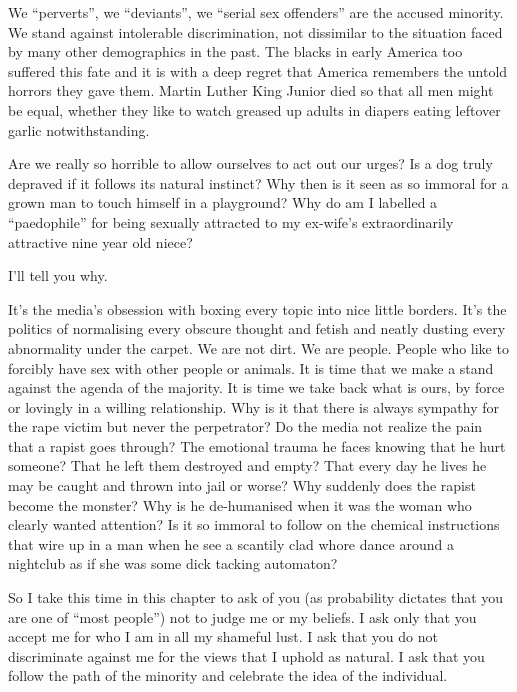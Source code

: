We “perverts”, we “deviants”, we “serial sex offenders” are the accused
minority. We stand against intolerable discrimination, not dissimilar to the
situation faced by many other demographics in the past. The blacks in early
America too suffered this fate and it is with a deep regret that America
remembers the untold horrors they gave them. Martin Luther King Junior died so
that all men might be equal, whether they like to watch greased up adults in
diapers eating leftover garlic notwithstanding.


Are we really so horrible to allow ourselves to act out our urges? Is a dog
truly depraved if it follows its natural instinct? Why then is it seen as so
immoral for a grown man to touch himself in a playground? Why do am I labelled a
“paedophile” for being sexually attracted to my ex-wife’s extraordinarily
attractive nine year old niece?


I’ll tell you why.



It’s the media’s obsession with boxing every topic into nice little borders.
It’s the politics of normalising every obscure thought and fetish and neatly
dusting every abnormality under the carpet. We are not dirt. We are people.
People who like to forcibly have sex with other people or animals. It is time
that we make a stand against the agenda of the majority. It is time we take back
what is ours, by force or lovingly in a willing relationship.
Why is it that there is always sympathy for the rape victim but never the
perpetrator? Do the media not realize the pain that a rapist goes through? The
emotional trauma he faces knowing that he hurt someone? That he left them
destroyed and empty? That every day he lives he may be caught and thrown into
jail or worse? Why suddenly does the rapist become the monster? Why is he
de-humanised when it was the woman who clearly wanted attention? Is it so
immoral to follow on the chemical instructions that wire up in a man when he see
a scantily clad whore dance around a nightclub as if she was some dick tacking
automaton?


So I take this time in this chapter to ask of you (as probability dictates that
you are one of “most people”) not to judge me or my beliefs. I ask only that you
accept me for who I am in all my shameful lust. I ask that you do not
discriminate against me for the views that I uphold as natural. I ask that you
follow the path of the minority and celebrate the idea of the individual.



